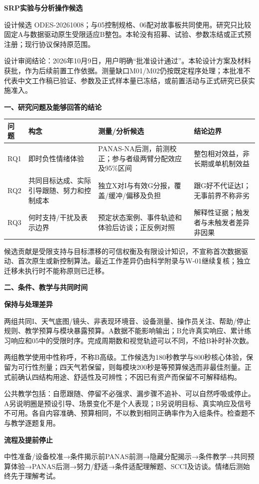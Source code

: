 \documentclass[11pt,a4paper]{article}
\newcommand{\reviewtitle}[1]{\begin{center}{\titlelatin\titlecjk\bfseries\fontsize{21}{28}\selectfont #1}\end{center}}
\newcommand{\reviewsection}[1]{\par\Needspace{6\baselineskip}\begin{center}{\titlelatin\titlecjk\bfseries\fontsize{14}{20}\selectfont #1}\end{center}}
\newcommand{\reviewsubsection}[1]{\par\Needspace{4\baselineskip}\begin{center}{\titlelatin\titlecjk\bfseries\fontsize{12}{18}\selectfont #1}\end{center}}
\begin{document}
\reviewtitle{SRP实验与分析操作候选}
设计候选 ODES-20261008；与05控制规格、06配对故事板共同使用。研究只比较固定A与数据驱动原生受限适应B整包。本轮没有招募、试验、参数冻结或正式预注册；现行协议保持原范围。

设计审阅结论：2026年10月9日，用户明确“批准设计通过”。本轮设计方案及材料获批，作为后续前置工作依据。测量缺口M01/M02仍按既定程序处理；本批准不代表中文工作稿已验证、参数及正式样本量已冻结，或前置活动与正式研究已获实施准入。

\reviewsection{一、研究问题及能够回答的结论}
\begin{longtable}{L{16mm}L{40mm}L{63mm}L{35mm}}
问题 & 构念 & 测量/分析候选 & 结论边界\\\hline
RQ1 & 即时负性情绪体验 & PANAS-NA后测，前测校正；参与者级两臂分配效应及95\%区间 & 整包相对效益，非长期或单机制效益\\
RQ2 & 共同目标达成、实际引导跟随、努力和控制成本 & 独立X对I与有效G分报，覆盖/缓冲/偏移及负担 & 跟G好不代证达I；无事前界不称非劣\\
RQ3 & 何时支持/干扰及表示边界 & 预定状态案例、事件轨迹和体验后访谈；正反例对照 & 解释性证据；触发者与未触发者差异非因果\\
\end{longtable}

候选贡献是受限支持与目标漂移的可信权衡及有限设计知识，不宣称首次数据驱动、首次原生或新控制算法。最近工作差异仍由科学附录与W-01继续复核；独立迁移未执行时不能称原则已迁移。

\reviewsection{二、条件、教学与共同时间}
\reviewsubsection{2.1 保持与处理差异}
两组共同I、天气底图/镜头、非表现环境音、设备测量、操作员关注、帮助/停止规则、教学预算与模块暴露预算。A数据不能影响输出；B允许真实响应、累计练习响应和05中的受限时序。完成周期数和视觉轨迹可以不同，不给B补时补次数。

两组教学使用中性称呼，不称B高级。工作候选为180秒教学与800秒核心体验，保留为可行性剂量；四天气若保留，则每模块200秒是等预算候选而非最佳剂量。正式前确认四结构用途、舒适性及可辨性；不因已有资产而保留不可解释结构。

公共教学包括：自愿跟随、停留不必强求、漏步骤不追补、可以自然呼吸或停止。A另说明圈是预设引导、场景变化不是个人表现；B另说明目标、真实响应及信号不可用。各自内容准确、预算相同，不以教到相同正确率作为入组条件。检查题不与教学逐题复用。

\reviewsubsection{2.2 流程及提前停止}
中性准备/设备校准→条件揭示前PANAS前测→隐藏分配揭示→条件教学→共同预算体验→PANAS后测→努力/舒适→条件适配理解题、SCCI及访谈。情绪后测始终先于理解考试。
\end{document}
